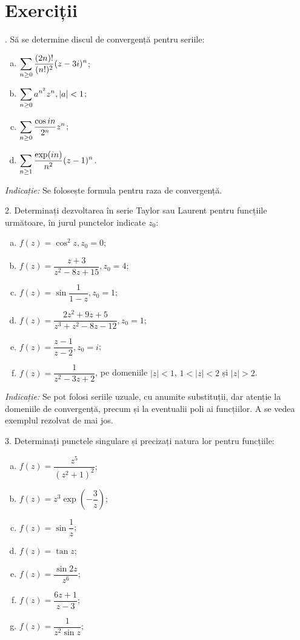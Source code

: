 \section{Exerciții}

\indent{}. Să se determine discul de convergență pentru seriile:
\begin{enumerate}[(a)]
\item $ \displaystyle\sum_{n \geq 0} \dfrac{(2n)!}{(n!)^2} (z - 3i)^n $;
\item $ \displaystyle\sum_{n \geq 0} a^{n^2}z^n, |a| < 1 $;
\item $ \displaystyle\sum_{n \geq 0} \dfrac{\cos in}{2^n} z^n $;
\item $ \displaystyle\sum_{n \geq 1} \dfrac{\exp(in)}{n^2} (z - 1)^n $.
\end{enumerate}

\emph{Indicație:} Se folosește formula pentru raza de convergență.

\vspace{0.3cm}

2. Determinați dezvoltarea în serie Taylor sau Laurent pentru funcțiile următoare,
în jurul punctelor indicate $ z_0 $:
\begin{enumerate}[(a)]
\item $ f(z) = \cos^2 z, z_0 = 0 $;
\item $ f(z) = \dfrac{z + 3}{z^2 - 8z + 15}, z_0 = 4 $;
\item $ f(z) = \sin \dfrac{1}{1 - z}, z_0 = 1 $;
\item $ f(z) = \dfrac{2z^2 + 9z + 5}{z^3 + z^2 - 8z - 12}, z_0 = 1 $;
\item $ f(z) = \dfrac{z - 1}{z - 2}, z_0 = i $;
\item $ f(z) = \dfrac{1}{z^2 - 3z + 2} $, pe domeniile $ |z| < 1 $,
  $ 1 < |z| < 2 $ și $ |z| > 2 $.
\end{enumerate}

\emph{Indicație:} Se pot folosi seriile uzuale, cu anumite substituții,
dar atenție la domeniile de convergență, precum și la eventualii poli ai
funcțiilor. A se vedea exemplul rezolvat de mai jos.

\vspace{0.3cm}

3. Determinați punctele singulare și precizați natura lor pentru funcțiile:
\begin{enumerate}[(a)]
\item $ f(z) = \dfrac{z^5}{(z^2 + 1)^2} $;
\item $ f(z) = z^3 \exp\left( -\dfrac{3}{z} \right) $;
\item $ f(z) = \sin \dfrac{1}{z} $;
\item $ f(z) = \tan z $;
\item $ f(z) = \dfrac{\sin 2z}{z^6} $;
\item $ f(z) = \dfrac{6z + 1}{z - 3} $;
\item $ f(z) = \dfrac{1}{z^2 \sin z} $;
\end{enumerate}


